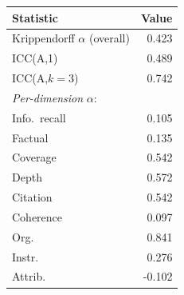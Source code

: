 \begin{tabular}{lr}
\toprule
Statistic & Value\\
\midrule
Krippendorff $\alpha$ (overall) & 0.423\\
ICC(A,1) & 0.489\\
ICC(A,$k{=}3$) & 0.742\\
\midrule
\multicolumn{2}{l}{\emph{Per-dimension } $\alpha$:}\\
Info.\ recall & 0.105 \\
Factual & 0.135 \\
Coverage & 0.542 \\
Depth & 0.572 \\
Citation & 0.542 \\
Coherence & 0.097 \\
Org. & 0.841 \\
Instr. & 0.276 \\
Attrib. & -0.102 \\
\bottomrule
\end{tabular}